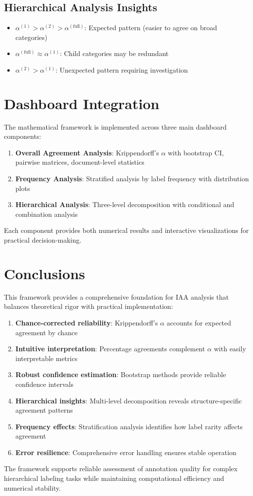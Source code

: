 \documentclass[11pt]{article}
\begin{document}
\subsection{Hierarchical Analysis Insights}

\begin{itemize}
\item $\alpha^{(1)} > \alpha^{(2)} > \alpha^{(\text{full})}$: Expected pattern (easier to agree on broad categories)
\item $\alpha^{(\text{full})} \approx \alpha^{(1)}$: Child categories may be redundant
\item $\alpha^{(2)} > \alpha^{(1)}$: Unexpected pattern requiring investigation
\end{itemize}

\section{Dashboard Integration}

The mathematical framework is implemented across three main dashboard components:

\begin{enumerate}
\item \textbf{Overall Agreement Analysis}: Krippendorff's $\alpha$ with bootstrap CI, pairwise matrices, document-level statistics
\item \textbf{Frequency Analysis}: Stratified analysis by label frequency with distribution plots
\item \textbf{Hierarchical Analysis}: Three-level decomposition with conditional and combination analysis
\end{enumerate}

Each component provides both numerical results and interactive visualizations for practical decision-making.

\section{Conclusions}

This framework provides a comprehensive foundation for IAA analysis that balances theoretical rigor with practical implementation:

\begin{enumerate}
\item \textbf{Chance-corrected reliability}: Krippendorff's $\alpha$ accounts for expected agreement by chance
\item \textbf{Intuitive interpretation}: Percentage agreements complement $\alpha$ with easily interpretable metrics
\item \textbf{Robust confidence estimation}: Bootstrap methods provide reliable confidence intervals
\item \textbf{Hierarchical insights}: Multi-level decomposition reveals structure-specific agreement patterns
\item \textbf{Frequency effects}: Stratification analysis identifies how label rarity affects agreement
\item \textbf{Error resilience}: Comprehensive error handling ensures stable operation
\end{enumerate}

The framework supports reliable assessment of annotation quality for complex hierarchical labeling tasks while maintaining computational efficiency and numerical stability.
\end{document}
